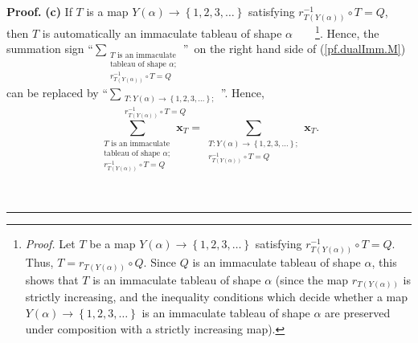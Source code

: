 \documentclass[numbers=enddot,12pt,final,onecolumn,notitlepage,abstracton]{scrartcl}%
\theoremstyle{definition}
\newenvironment{proof}[1][Proof]{\noindent\textbf{#1.} }{\ \rule{0.5em}{0.5em}}
\let\sumnonlimits\sum
\renewcommand{\sum}{\sumnonlimits\limits}
\begin{document}
\begin{proof}
\textbf{(c)} If $T$ is a map $Y\left(  \alpha\right)  \rightarrow\left\{
1,2,3,\ldots\right\}  $ satisfying $r_{T\left(  Y\left(  \alpha\right)
\right)  }^{-1}\circ T=Q$, then $T$ is automatically an immaculate tableau of
shape $\alpha$\ \ \ \ \footnote{\textit{Proof.} Let $T$ be a map $Y\left(
\alpha\right)  \rightarrow\left\{  1,2,3,\ldots\right\}  $ satisfying
$r_{T\left(  Y\left(  \alpha\right)  \right)  }^{-1}\circ T=Q$. Thus,
$T=r_{T\left(  Y\left(  \alpha\right)  \right)  }\circ Q$. Since $Q$ is an
immaculate tableau of shape $\alpha$, this shows that $T$ is an immaculate
tableau of shape $\alpha$ (since the map $r_{T\left(  Y\left(  \alpha\right)
\right)  }$ is strictly increasing, and the inequality conditions which decide
whether a map $Y\left(  \alpha\right)  \rightarrow\left\{  1,2,3,\ldots
\right\}  $ is an immaculate tableau of shape $\alpha$ are preserved under
composition with a strictly increasing map).}. Hence, the summation sign
\textquotedblleft$\sum_{\substack{T\text{ is an immaculate}\\\text{tableau of
shape }\alpha;\\r_{T\left(  Y\left(  \alpha\right)  \right)  }^{-1}\circ
T=Q}}$\textquotedblright\ on the right hand side of (\ref{pf.dualImm.M}) can
be replaced by \textquotedblleft$\sum_{\substack{T:Y\left(  \alpha\right)
\rightarrow\left\{  1,2,3,\ldots\right\}  ;\\r_{T\left(  Y\left(
\alpha\right)  \right)  }^{-1}\circ T=Q}}$\textquotedblright. Hence,%
\[
\sum_{\substack{T\text{ is an immaculate}\\\text{tableau of shape }%
\alpha;\\r_{T\left(  Y\left(  \alpha\right)  \right)  }^{-1}\circ
T=Q}}\mathbf{x}_{T}=\sum_{\substack{T:Y\left(  \alpha\right)  \rightarrow
\left\{  1,2,3,\ldots\right\}  ;\\r_{T\left(  Y\left(  \alpha\right)  \right)
}^{-1}\circ T=Q}}\mathbf{x}_{T}.
\]



\end{proof}
\end{document}

